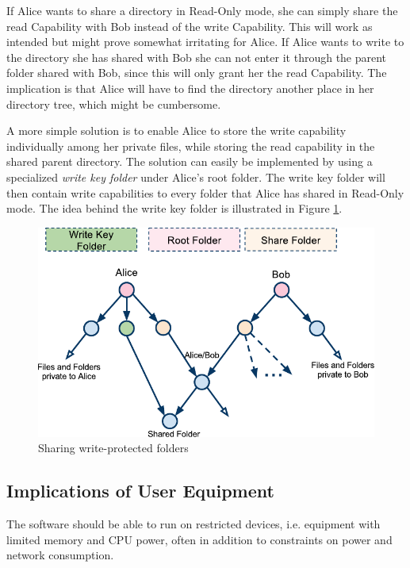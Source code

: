 \documentclass[pdftex,english,10pt,b5paper,twoside]{book}
\begin{document}
If Alice wants to share a directory in Read-Only mode, she can simply share the
read Capability with Bob instead of the write Capability. This will work as
intended but might prove somewhat irritating for Alice. If Alice wants to write
to the directory she has shared with Bob she can not enter it through the
parent folder shared with Bob, since this will only grant her the read
Capability. The implication is that Alice will have to find the directory
another place in her directory tree, which might be cumbersome. 

A more simple solution is to enable Alice to store the write capability
individually among her private files, while storing the read capability in the
shared parent directory. The solution can easily be implemented by using a
specialized \emph{write key folder} under Alice's root folder. The write key
folder will then contain write capabilities to every folder that Alice has
shared in Read-Only mode.  The idea behind the write key folder is illustrated
in Figure \ref{fig:AS:readonly}.

\begin{figure}[h!]
    \centering
    \includegraphics[width=\columnwidth]{ArchitectureShareReadOnlyFolder.pdf}
    \caption{Sharing write-protected folders}
    \label{fig:AS:readonly}
\end{figure}

\subsection{Implications of User Equipment}

The software should be able to run on restricted devices, i.e. equipment with
limited memory and \ac{CPU} power, often in addition to constraints on power and
network consumption.
\end{document}
